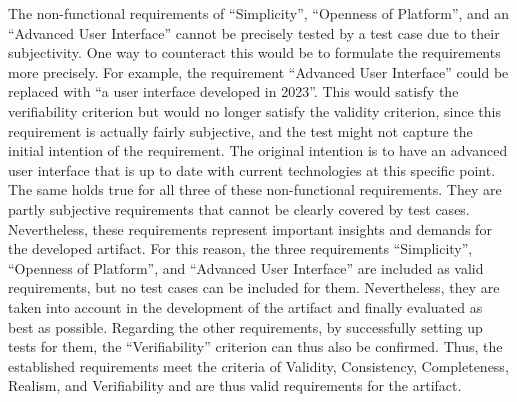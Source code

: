 The non-functional requirements of \enquote{Simplicity}, \enquote{Openness of Platform}, and an \enquote{Advanced User Interface} cannot be precisely tested by a test case due to their subjectivity. One way to counteract this would be to formulate the requirements more precisely. For example, the requirement \enquote{Advanced User Interface} could be replaced with \enquote{a user interface developed in 2023}. This would satisfy the verifiability criterion but would no longer satisfy the validity criterion, since this requirement is actually fairly subjective, and the test might not capture the initial intention of the requirement. The original intention is to have an advanced user interface that is up to date with current technologies at this specific point. The same holds true for all three of these non-functional requirements. They are partly subjective requirements that cannot be clearly covered by test cases. Nevertheless, these requirements represent important insights and demands for the developed artifact. For this reason, the three requirements \enquote{Simplicity}, \enquote{Openness of Platform}, and \enquote{Advanced User Interface} are included as valid requirements, but no test cases can be included for them. Nevertheless, they are taken into account in the development of the artifact and finally evaluated as best as possible. Regarding the other requirements, by successfully setting up tests for them, the \enquote{Verifiability} criterion can thus also be confirmed. Thus, the established requirements meet the criteria of Validity, Consistency, Completeness, Realism, and Verifiability and are thus valid requirements for the artifact.

